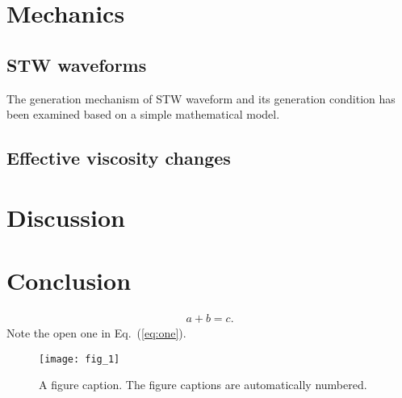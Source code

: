 \documentclass[aps,pre,preprint,groupedaddress,showkeys]{revtex4-2}
\begin{document}


\section{Mechanics}\label{mec}
\subsection{STW waveforms}
The generation mechanism of STW waveform and its generation condition has been examined based on a simple mathematical model.


\subsection{Effective viscosity changes}

\section{Discussion}\label{mec}

\section{Conclusion}\label{con}


\begin{eqnarray}
a+b=c
\label{eq:one}.
\end{eqnarray}
Note the open one in Eq.~(\ref{eq:one}).

\begin{figure}
\texttt{[image: fig\_1]}%
\caption{\label{fig:epsart} A figure caption. The figure captions are automatically numbered.}
\end{figure}



%
\end{document}
